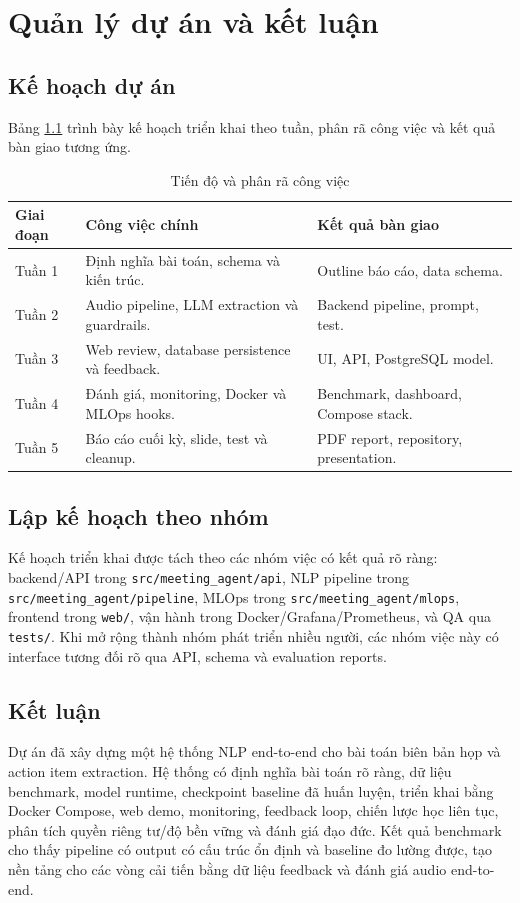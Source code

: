 \chapter{Quản lý dự án và kết luận}

\section{Kế hoạch dự án}

Bảng \ref{tab:project-plan} trình bày kế hoạch triển khai theo tuần, phân rã công việc và kết quả bàn giao tương ứng.

\begin{table}[H]
\centering
\small
\caption{Tiến độ và phân rã công việc}
\label{tab:project-plan}
\begin{tabularx}{\textwidth}{@{}p{2.0cm}X X@{}}
\toprule
\textbf{Giai đoạn} & \textbf{Công việc chính} & \textbf{Kết quả bàn giao} \\
\midrule
Tuần 1 & Định nghĩa bài toán, schema và kiến trúc. & Outline báo cáo, data schema. \\
Tuần 2 & Audio pipeline, LLM extraction và guardrails. & Backend pipeline, prompt, test. \\
Tuần 3 & Web review, database persistence và feedback. & UI, API, PostgreSQL model. \\
Tuần 4 & Đánh giá, monitoring, Docker và MLOps hooks. & Benchmark, dashboard, Compose stack. \\
Tuần 5 & Báo cáo cuối kỳ, slide, test và cleanup. & PDF report, repository, presentation. \\
\bottomrule
\end{tabularx}
\end{table}

\section{Lập kế hoạch theo nhóm}

Kế hoạch triển khai được tách theo các nhóm việc có kết quả rõ ràng: backend/API trong \texttt{src/meeting\_agent/api}, NLP pipeline trong \texttt{src/meeting\_agent/pipeline}, MLOps trong \texttt{src/meeting\_agent/mlops}, frontend trong \texttt{web/}, vận hành trong Docker/Grafana/Prometheus, và QA qua \texttt{tests/}. Khi mở rộng thành nhóm phát triển nhiều người, các nhóm việc này có interface tương đối rõ qua API, schema và evaluation reports.

\section{Kết luận}

Dự án đã xây dựng một hệ thống NLP end-to-end cho bài toán biên bản họp và action item extraction. Hệ thống có định nghĩa bài toán rõ ràng, dữ liệu benchmark, model runtime, checkpoint baseline đã huấn luyện, triển khai bằng Docker Compose, web demo, monitoring, feedback loop, chiến lược học liên tục, phân tích quyền riêng tư/độ bền vững và đánh giá đạo đức. Kết quả benchmark cho thấy pipeline có output có cấu trúc ổn định và baseline đo lường được, tạo nền tảng cho các vòng cải tiến bằng dữ liệu feedback và đánh giá audio end-to-end.
